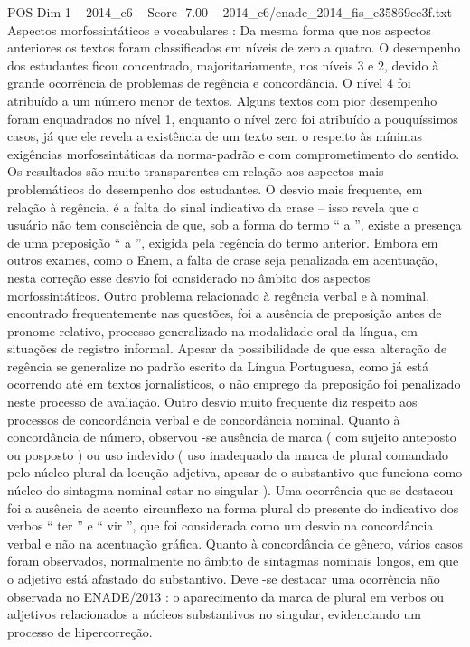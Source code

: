 \begin{textsample}{POS Dim 1 – 2014\_c6 – Score -7.00 – 2014\_c6/enade\_2014\_fis\_e35869ce3f.txt}
Aspectos morfossintáticos e vocabulares : Da mesma forma que nos aspectos anteriores os textos foram classificados em níveis de zero a quatro.
O desempenho dos estudantes ficou concentrado, majoritariamente, nos níveis 3 e 2, devido à grande ocorrência de problemas de regência e concordância.
O nível 4 foi atribuído a um número menor de textos.
Alguns textos com pior desempenho foram enquadrados no nível 1, enquanto o nível zero foi atribuído a pouquíssimos casos, já que ele revela a existência de um texto sem o respeito às mínimas exigências morfossintáticas da norma-padrão e com comprometimento do sentido.
Os resultados são muito transparentes em relação aos aspectos mais problemáticos do desempenho dos estudantes.
O desvio mais frequente, em relação à regência, é a falta do sinal indicativo da crase – isso revela que o usuário não tem consciência de que, sob a forma do termo “ a ”, existe a presença de uma preposição “ a ”, exigida pela regência do termo anterior.
Embora em outros exames, como o Enem, a falta de crase seja penalizada em acentuação, nesta correção esse desvio foi considerado no âmbito dos aspectos morfossintáticos.
Outro problema relacionado à regência verbal e à nominal, encontrado frequentemente nas questões, foi a ausência de preposição antes de pronome relativo, processo generalizado na modalidade oral da língua, em situações de registro informal.
Apesar da possibilidade de que essa alteração de regência se generalize no padrão escrito da Língua Portuguesa, como já está ocorrendo até em textos jornalísticos, o não emprego da preposição foi penalizado neste processo de avaliação.
Outro desvio muito frequente diz respeito aos processos de concordância verbal e de concordância nominal.
Quanto à concordância de número, observou -se ausência de marca ( com sujeito anteposto ou posposto ) ou uso indevido ( uso inadequado da marca de plural comandado pelo núcleo plural da locução adjetiva, apesar de o substantivo que funciona como núcleo do sintagma nominal estar no singular ).
Uma ocorrência que se destacou foi a ausência de acento circunflexo na forma plural do presente do indicativo dos verbos “ ter ” e “ vir ”, que foi considerada como um desvio na concordância verbal e não na acentuação gráfica.
Quanto à concordância de gênero, vários casos foram observados, normalmente no âmbito de sintagmas nominais longos, em que o adjetivo está afastado do substantivo.
Deve -se destacar uma ocorrência não observada no ENADE/2013 : o aparecimento da marca de plural em verbos ou adjetivos relacionados a núcleos substantivos no singular, evidenciando um processo de hipercorreção.

\end{textsample}
